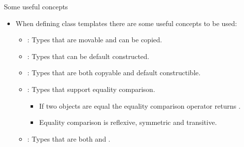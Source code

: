 \begin{frame}[t,fragile]{Some useful concepts}
\begin{itemize}
  \item When defining class templates there are some useful concepts to be used:

  \begin{itemize}

    \item {}: Types that are movable and can be copied.

    \item {}: Types that can be default constructed.

    \item {}: Types that are both copyable and default constructible.

    \item {}: Types that support equality comparison.
    \begin{itemize}
      \item If two objects are equal the equality comparison operator returns .
      \item Equality comparison is reflexive, symmetric and transitive.
    \end{itemize}

    \item {}: Types that are both  and .

  \end{itemize}

\end{itemize}
\end{frame}


